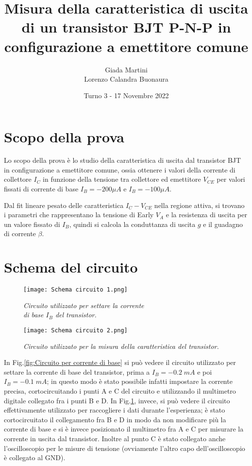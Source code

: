 \documentclass[a4paper, 11pt]{article}
\title{\textbf{Misura della caratteristica di uscita di un transistor BJT P-N-P in configurazione a emettitore comune}}
\author{Giada Martini \\ Lorenzo Calandra Buonaura}
\date{Turno 3 - 17 Novembre 2022}
\begin{document}
\maketitle

\section{Scopo della prova}
Lo scopo della prova è lo studio della caratteristica di uscita dal transistor BJT in configurazione a emettitore comune, ossia ottenere i valori della corrente di collettore $I_C$ in funzione della tensione tra collettore ed emettitore $V_{CE}$  per valori fissati di corrente di base $I_B = -200 \mu A $ e $I_B = -100 \mu A$. 

Dal fit lineare pesato delle caratteristica $I_C-V_{CE}$ nella regione attiva, si trovano i parametri che rappresentano la tensione di Early $V_A$ e la resistenza di uscita per un valore fissato di $I_B$, quindi si calcola la conduttanza di uscita $g$ e il guadagno di corrente $\beta$. 

\section{Schema del circuito}
\begin{figure}[!ht]
  \centering
  \begin{minipage}[b]{0.51\textwidth}
    \texttt{[image: Schema circuito 1.png]}
    \caption{\textit{Circuito utilizzato per settare la corrente \\ di base $I_B$ del transistor.}}
    \label{fig:Circuito per corrente di base}
  \end{minipage}
  \hfill
  \begin{minipage}[b]{0.48\textwidth}
    \texttt{[image: Schema circuito 2.png]}
    \caption{\textit{Circuito utilizzato per la misura della caratteristica del transistor.}}
    \label{fig:Circuito utilizzato per la prova}
  \end{minipage}
\end{figure}

In Fig.\ref{fig:Circuito per corrente di base} si può vedere il circuito utilizzato per settare la corrente di base del transistor, prima a $I_B = -0.2 \; mA $ e poi $I_B = -0.1 \; mA$; in questo modo è stato possibile infatti impostare la corrente precisa, cortocircuitando i punti A e C del circuito e utilizzando il multimetro digitale collegato fra i punti B e D. In Fig.\ref{fig:Circuito utilizzato per la prova}, invece, si può vedere il circuito effettivamente utilizzato per raccogliere i dati durante l'esperienza; è stato cortocircuitato il collegamento fra B e D in modo da non modificare più la corrente di base e si è invece posizionato il multimetro fra A e C per misurare la corrente in uscita dal transistor. Inoltre al punto C è stato collegato anche l'oscilloscopio per le misure di tensione (ovviamente l'altro capo dell'oscilloscopio è collegato al GND).
\end{document}
